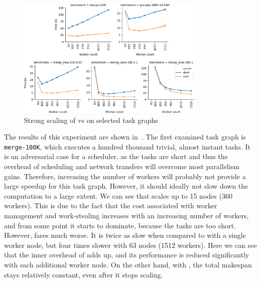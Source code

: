 \begin{figure}[h]
	\centering
	\includegraphics[width=0.8\textwidth]{./imgs/rsds/charts/rsds-dask-scaling}
	\caption{Strong scaling of \rsds{} vs \dask{} on selected task graphs}
	\label{fig:rsds-dask-scaling}
\end{figure}

The results of this experiment are shown in~. The first examined task
graph is \texttt{merge-100K}, which executes a hundred thousand trivial, almost instant
tasks. It is an adversarial case for a scheduler, as the tasks are short and thus the overhead of
scheduling and network transfers will overcome most parallelism gains. Therefore, increasing the
number of workers will probably not provide a large speedup for this task graph. However, it should
ideally not slow down the computation to a large extent. We can see that
\rsds{} scales up to \num{15} nodes
(\num{360} workers). This is due to the fact that the cost associated with worker
management and work-stealing increases with an increasing number of workers, and from some point it
starts to dominate, because the tasks are too short. However, \dask{} fares
much worse. It is twice as slow when compared to \rsds{} with a single worker
node, but four times slower with \num{63} nodes (\num{1512}
workers). Here we can see that the inner overhead of \dask{} adds up, and its
performance is reduced significantly with each additional worker node. On the other hand, with
\rsds{}, the total makespan stays relatively constant, even after it stops
scaling.

